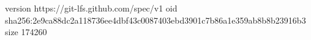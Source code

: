 version https://git-lfs.github.com/spec/v1
oid sha256:2e9ca88dc2a118736ee4dbf43c0087403ebd3901c7b86a1e359ab8b8b23916b3
size 174260
